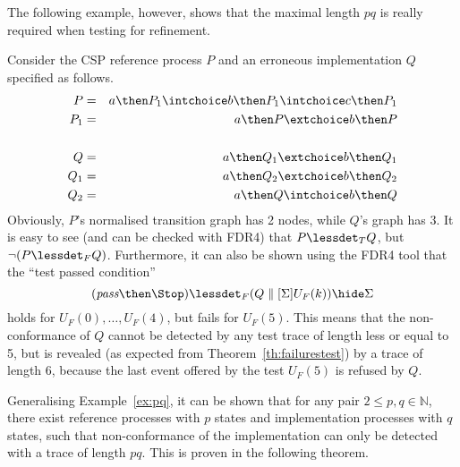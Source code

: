 The following example, however, shows that the maximal length $pq$ is really required 
when testing for refinement.
\begin{example}\label{ex:pq}
Consider the CSP reference process $P$ and an erroneous implementation $Q$ specified
as follows.
\begin{eqnarray*}
P & = & a \then P_1 \intchoice b \then P_1 \intchoice c \then P_1
\\
P_1 & = & a \then P \extchoice b\then P
\\ & &  \\
Q & = & a\then Q_1 \extchoice b\then Q_1
\\
Q_1 & = & a\then Q_2 \extchoice b\then Q_2
\\
Q_2 & = & a\then Q \intchoice b\then Q
\end{eqnarray*}
Obviously, $P$'s normalised transition graph has 2 nodes, 
while $Q$'s graph has 3.
It is easy to see (and can be checked with FDR4) that $P\lessdet_T Q$, but 
$\neg(P\lessdet_F Q)$. Furthermore, it can also be shown using the FDR4 tool that
the ``test passed condition'' 
\[
(\epass\then\Stop) \lessdet_F (Q\parallel[\Sigma] U_F(k))\hide \Sigma
\]
holds for $U_F(0),\dots,U_F(4)$, but fails for $U_F(5)$. This means that the
non-conformance of $Q$ cannot be detected by any test trace of length 
less or equal to 5, but is revealed (as expected from Theorem~\ref{th:failurestest})
by a trace of length 6, because the last event offered by the test $U_F(5)$ is 
refused by $Q$.
\xbox
\end{example}
%
Generalising Example~\ref{ex:pq}, it can be shown that for any pair 
$2\le p,q \in\mathbb{N}$,  
there exist reference processes with $p$ states
and implementation processes with $q$ states, such that non-conformance of the 
implementation
can only be detected with a trace of length $pq$. This is proven in the following 
theorem.

